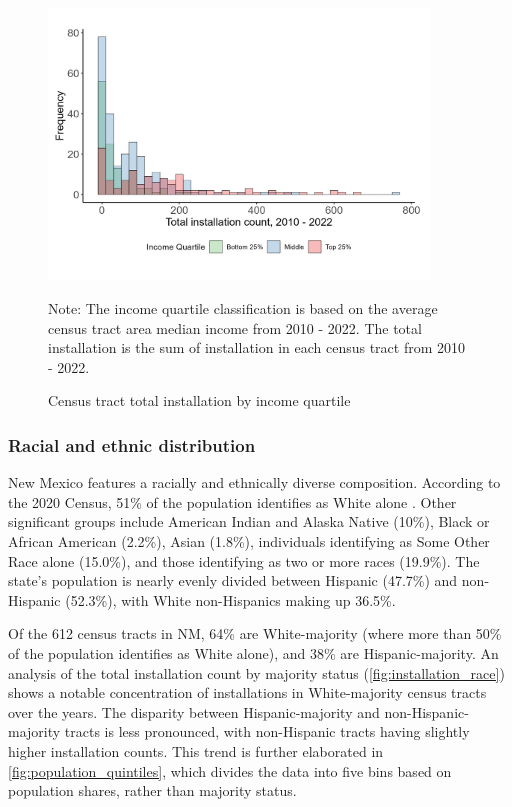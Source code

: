 \documentclass[12pt,twoside,letterpaper]{article}
\begin{document}
\begin{figure}[!ht]
    \centering
\includegraphics[width=0.9\textwidth]{figures/comparative_histogram_installation.png}
    \caption{Census tract total installation by income quartile}
    \label{fig:comparative_histogram_installation}
        \begin{flushleft}
        \footnotesize Note: The income quartile classification is based on the average census tract area median income from 2010 - 2022. The total installation is the sum of installation in each census tract from 2010 - 2022.  
    \end{flushleft}
\end{figure}

\subsubsection{Racial and ethnic distribution}

New Mexico features a racially and ethnically diverse composition. According to the 2020 Census, 51\% of the population identifies as White alone \parencite{uscensus2020}. Other significant groups include American Indian and Alaska Native (10\%), Black or African American (2.2\%), Asian (1.8\%), individuals identifying as Some Other Race alone (15.0\%), and those identifying as two or more races (19.9\%). The state’s population is nearly evenly divided between Hispanic (47.7\%) and non-Hispanic (52.3\%), with White non-Hispanics making up 36.5\%.

Of the 612 census tracts in NM, 64\% are White-majority (where more than 50\% of the population identifies as White alone), and 38\% are Hispanic-majority. An analysis of the total installation count by majority status (\autoref{fig:installation_race}) shows a notable concentration of installations in White-majority census tracts over the years. The disparity between Hispanic-majority and non-Hispanic-majority tracts is less pronounced, with non-Hispanic tracts having slightly higher installation counts. This trend is further elaborated in \autoref{fig:population_quintiles}, which divides the data into five bins based on population shares, rather than majority status.
\end{document}
